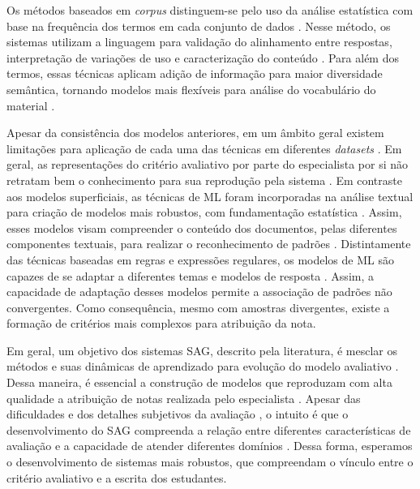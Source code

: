 Os métodos baseados em \textit{corpus} distinguem-se pelo uso da análise estatística com base na frequência dos termos em cada conjunto de dados \cite{kumar2019}. Nesse método, os sistemas utilizam a linguagem para validação do alinhamento entre respostas, interpretação de variações de uso e caracterização do conteúdo \cite{ziai2012, menini2019}. Para além dos termos, essas técnicas aplicam adição de informação para maior diversidade semântica, tornando modelos mais flexíveis para análise do vocabulário do material \cite{fowler2021}.

Apesar da consistência dos modelos anteriores, em um âmbito geral existem limitações para aplicação de cada uma das técnicas em diferentes \textit{datasets} \cite{riordan2019, ding2020}. Em geral, as representações do critério avaliativo por parte do especialista por si não retratam bem o conhecimento para sua reprodução pela sistema \cite{filighera2020}. Em contraste aos modelos superficiais, as técnicas de ML foram incorporadas na análise textual para criação de modelos mais robustos, com fundamentação estatística \cite{galhardi2018b}. Assim, esses modelos visam compreender o conteúdo dos documentos, pelas diferentes componentes textuais, para realizar o reconhecimento de padrões \cite{suzen2020}. Distintamente das técnicas baseadas em regras e expressões regulares, os modelos de ML são capazes de se adaptar a diferentes temas e modelos de resposta \cite{zhang2016, saha2019, camus2020}. Assim, a capacidade de adaptação desses modelos permite a associação de padrões não convergentes. Como consequência, mesmo com amostras divergentes, existe a formação de critérios mais complexos para atribuição da nota.

Em geral, um objetivo dos sistemas SAG, descrito pela literatura, é mesclar os métodos e suas dinâmicas de aprendizado para evolução do modelo avaliativo \cite{burrows2015, zesch2018}. Dessa maneira, é essencial a construção de modelos que reproduzam com alta qualidade a atribuição de notas realizada pelo especialista \cite{jordan2012}. Apesar das dificuldades e dos detalhes subjetivos da avaliação \cite{roy2018}, o intuito é que o desenvolvimento do SAG compreenda a relação entre diferentes características de avaliação e a capacidade de atender diferentes domínios \cite{sung2019a, saha2019}. Dessa forma, esperamos o desenvolvimento de sistemas mais robustos, que compreendam o vínculo entre o critério avaliativo e a escrita dos estudantes.
